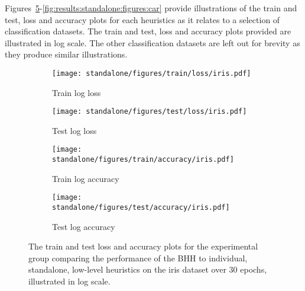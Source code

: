 Figures~\ref{fig:results:standalone:figures:iris}-\ref{fig:results:standalone:figures:car} provide illustrations of the train and test, loss and accuracy plots for each heuristics as it relates to a selection of classification datasets. The train and test, loss and accuracy plots provided are illustrated in log scale. The other classification datasets are left out for brevity as they produce similar illustrations.


\begin{figure}[H]
	\begin{subfigure}{0.5\textwidth}
		\centering
		\texttt{[image: standalone/figures/train/loss/iris.pdf]}
		\caption{Train log loss}
		\label{fig:results:standalone:figures:loss:train:iris}
	\end{subfigure}
	\begin{subfigure}{0.5\textwidth}
		\centering
		\texttt{[image: standalone/figures/test/loss/iris.pdf]}
		\caption{Test log loss}
		\label{fig:results:standalone:figures:loss:test:iris}
	\end{subfigure}
	\par\bigskip
	\begin{subfigure}{0.5\textwidth}
		\centering
		\texttt{[image: standalone/figures/train/accuracy/iris.pdf]}
		\caption{Train log accuracy}
		\label{fig:results:standalone:figures:accuracy:train:iris}
	\end{subfigure}
	\begin{subfigure}{0.5\textwidth}
		\centering
		\texttt{[image: standalone/figures/test/accuracy/iris.pdf]}
		\caption{Test log accuracy}
		\label{fig:results:standalone:figures:accuracy:test:iris}
	\end{subfigure}
	\par\bigskip
	\caption{The train and test loss and accuracy plots for the experimental group comparing the performance of the \acs{BHH} to individual, standalone, low-level heuristics on the iris dataset over 30 epochs, illustrated in log scale.}
	\label{fig:results:standalone:figures:iris}
\end{figure}

